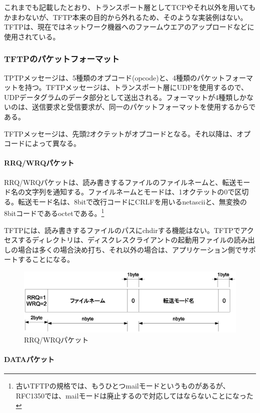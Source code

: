 これまでも記載したとおり、トランスポート層としてTCPやそれ以外を用いてもかまわないが、TFTP本来の目的から外れるため、そのような実装例はない。TFTPは、現在ではネットワーク機器へのファームウエアのアップロードなどに使用されている。

\subsubsection{TFTPのパケットフォーマット}

TPTPメッセージは、5種類のオプコード(opcode)と、4種類のパケットフォーマットを持つ。TFTPメッセージは、トランスポート層にUDPを使用するので、UDPデータグラムのデータ部分として送出される。フォーマットが4種類しかないのは、送信要求と受信要求が、同一のパケットフォーマットを使用するからである。

TFTPメッセージは、先頭2オクテットがオプコードとなる。それ以降は、オプコードによって異なる。

\paragraph{RRQ/WRQパケット}

RRQ/WRQパケットは、読み書きするファイルのファイルネームと、転送モード名の文字列を通知する。ファイルネームとモードは、1オクテットの0で区切る。転送モード名は、8bitで改行コードにCRLFを用いるnetasciiと、無変換の8bitコードであるoctetである。\footnote{古いTFTPの規格では、もうひとつmailモードというものがあるが、RFC1350では、mailモードは廃止するので対応してはならないことになった}

TFTPには、読み書きするファイルのパスにchdirする機能はない。TFTPでアクセスするディレクトリは、ディスクレスクライアントの起動用ファイルの読み出しの場合は多くの場合決め打ち、それ以外の場合は、アプリケーション側でサポートすることになる。

\begin{figure}[htbp]
	\includegraphics[width=12cm,clip]{draw/tftp_op1.eps}
	\caption{RRQ/WRQパケット}
	\label{fig:ftfp_op1}
\end{figure}


\paragraph{DATAパケット}

